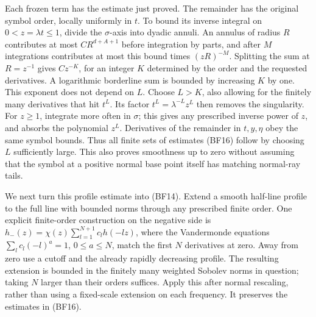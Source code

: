 \documentclass[
  11pt,
]{article}
\begin{document}
Each frozen term has the estimate just proved. The remainder has the
original symbol order, locally uniformly in \(t\). To bound its inverse
integral on \(0<z=\lambda t\leq1\), divide the \(\sigma\)-axis into
dyadic annuli. An annulus of radius \(R\) contributes at most
\(C R^{d+A+1}\) before integration by parts, and after \(M\)
integrations contributes at most this bound times \((zR)^{-M}\).
Splitting the sum at \(R=z^{-1}\) gives \(Cz^{-K}\), for an integer
\(K\) determined by the order and the requested derivatives. A
logarithmic borderline sum is bounded by increasing \(K\) by one. This
exponent does not depend on \(L\). Choose \(L>K\), also allowing for the
finitely many derivatives that hit \(t^L\). Its factor
\(t^L=\lambda^{-L}z^L\) then removes the singularity. For \(z\geq1\),
integrate more often in \(\sigma\); this gives any prescribed inverse
power of \(z\), and absorbs the polynomial \(z^L\). Derivatives of the
remainder in \(t,y,\eta\) obey the same symbol bounds. Thus all finite
sets of estimates (BF16) follow by choosing \(L\) sufficiently large.
This also proves smoothness up to zero without assuming that the symbol
at a positive normal base point itself has matching normal-ray tails.

We next turn this profile estimate into (BF14). Extend a smooth
half-line profile to the full line with bounded norms through any
prescribed finite order. One explicit finite-order construction on the
negative side is \(h_-(z)=\chi(z)\sum_{l=1}^{N+1}c_l h(-lz)\), where the
Vandermonde equations \(\sum_lc_l(-l)^a=1\), \(0\leq a\leq N\), match
the first \(N\) derivatives at zero. Away from zero use a cutoff and the
already rapidly decreasing profile. The resulting extension is bounded
in the finitely many weighted Sobolev norms in question; taking \(N\)
larger than their orders suffices. Apply this after normal rescaling,
rather than using a fixed-scale extension on each frequency. It
preserves the estimates in (BF16).
\end{document}

